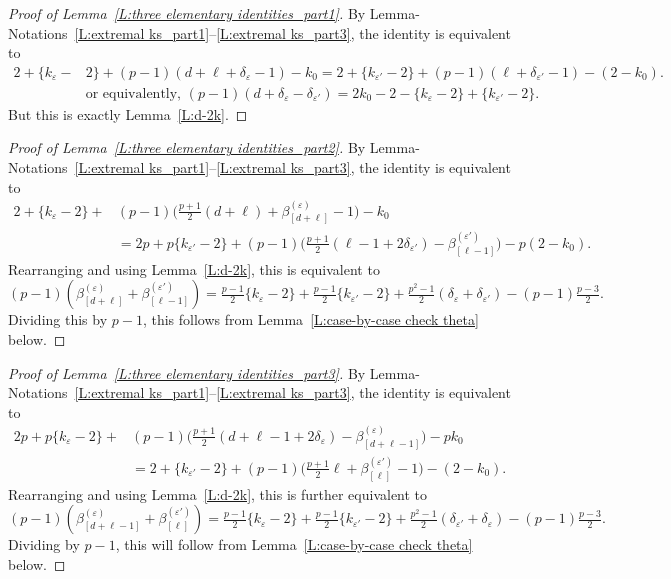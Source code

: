 \documentclass[12pt]{amsart}
\theoremstyle{definition}
\numberwithin{equation}{subsection}
\begin{document}
\medskip
\begin{proof}[Proof of Lemma~\ref{L:three elementary identities_part1}]
By Lemma-Notations~\ref{L:extremal ks_part1}--\ref{L:extremal ks_part3}, the identity is equivalent to
\begin{align*}
2+\{k_\varepsilon -&2\} + (p-1)(d+\ell +\delta_\varepsilon -1) -k_0 = 2+\{k_{\varepsilon '}-2\} + (p-1)(\ell + \delta_{\varepsilon'} -1) - (2-k_0).
\\
&
\textrm{or equivalently, }(p-1)(d+\delta_\varepsilon - \delta_{\varepsilon'}) = 2k_0 -2 -\{k_\varepsilon-2\}+\{k_{\varepsilon'}-2\}.
\end{align*}
But this is exactly Lemma~\ref{L:d-2k}.
\end{proof}

\begin{proof}[Proof of Lemma~\ref{L:three elementary identities_part2}]
By Lemma-Notations~\ref{L:extremal ks_part1}--\ref{L:extremal ks_part3}, the identity is equivalent to
\begin{align*}
2 +\{k_{\varepsilon} -2\} + &(p-1) \big(\tfrac{p+1}2 (d+\ell) +\beta_{[d+\ell]}^{(\varepsilon)}-1\big) - k_0\\ & = 
2p +p\{k_{\varepsilon'} -2\} + (p-1) \big(\tfrac{p+1}2 ( \ell-1+2\delta_{\varepsilon'})- \beta_{[\ell-1]}^{(\varepsilon')}\big)   -p(2-k_0).
\end{align*}
Rearranging and using Lemma~\ref{L:d-2k}, this is equivalent to
$$  (p-1)(\beta_{[d+\ell]}^{(\varepsilon)}+ \beta_{[\ell-1]}^{(\varepsilon')} )=
\tfrac{p-1}2\{k_\varepsilon-2\} +\tfrac{p-1}2\{k_{\varepsilon'} - 2\} + \tfrac{p^2-1}2(  \delta_\varepsilon+\delta_{\varepsilon'}) -(p-1)\tfrac{p-3}2.
$$
Dividing this by $p-1$, this follows from Lemma~\ref{L:case-by-case check theta} below.
\end{proof}

\begin{proof}[Proof of Lemma~\ref{L:three elementary identities_part3}]
By Lemma-Notations~\ref{L:extremal ks_part1}--\ref{L:extremal ks_part3}, the identity is equivalent to
\begin{align*}
2p +p\{k_{\varepsilon} -2\} + &(p-1) \big(\tfrac{p+1}2 (d+\ell-1+2\delta_{\varepsilon}) -\beta_{[d+\ell-1]}^{(\varepsilon)}\big) - pk_0
\\ & = 
2 +\{k_{\varepsilon'} -2\} + (p-1) \big(\tfrac{p+1}2 \ell +\beta_{[\ell]}^{(\varepsilon')}-1\big)   -(2-k_0).
\end{align*}
Rearranging and using Lemma~\ref{L:d-2k}, this is further equivalent to
$$(p-1)(\beta_{[d+\ell-1]}^{(\varepsilon)}+ \beta_{[\ell]}^{(\varepsilon')})=
\tfrac{p-1}2\{k_\varepsilon-2\} +\tfrac{p-1}2\{k_{\varepsilon'} - 2\} + \tfrac{p^2-1}2(\delta_{\varepsilon'} + \delta_\varepsilon) -(p-1)\tfrac{p-3}2.
$$
Dividing by $p-1$, this will follow from Lemma~\ref{L:case-by-case check theta} below.
\end{proof}
\end{document}
